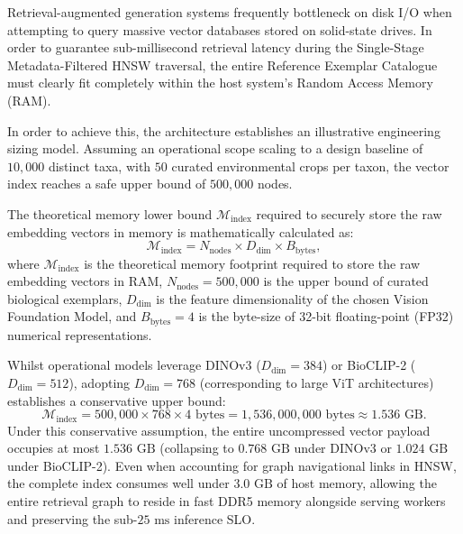 Retrieval-augmented generation systems frequently bottleneck on disk I/O when attempting to query massive vector databases stored on solid-state drives. In order to guarantee sub-millisecond retrieval latency during the Single-Stage Metadata-Filtered HNSW traversal, the entire Reference Exemplar Catalogue must clearly fit completely within the host system's Random Access Memory (RAM).

In order to achieve this, the architecture establishes an illustrative engineering sizing model. Assuming an operational scope scaling to a design baseline of $10{,}000$ distinct taxa, with $50$ curated environmental crops per taxon, the vector index reaches a safe upper bound of $500{,}000$ nodes.

The theoretical memory lower bound $\mathcal{M}_{\text{index}}$ required to securely store the raw embedding vectors in memory is mathematically calculated as:
\[
\mathcal{M}_{\text{index}} = N_{\text{nodes}} \times D_{\text{dim}} \times B_{\text{bytes}},
\]
where $\mathcal{M}_{\text{index}}$ is the theoretical memory footprint required to store the raw embedding vectors in RAM, $N_{\text{nodes}} = 500{,}000$ is the upper bound of curated biological exemplars, $D_{\text{dim}}$ is the feature dimensionality of the chosen Vision Foundation Model, and $B_{\text{bytes}} = 4$ is the byte-size of 32-bit floating-point (FP32) numerical representations.

Whilst operational models leverage DINOv3 ($D_{\text{dim}} = 384$) or BioCLIP-2 ($D_{\text{dim}} = 512$), adopting $D_{\text{dim}} = 768$ (corresponding to large ViT architectures) establishes a conservative upper bound:
\[
\mathcal{M}_{\text{index}} = 500{,}000 \times 768 \times 4 \text{ bytes} = 1{,}536{,}000{,}000 \text{ bytes} \approx 1.536 \text{ GB}.
\]
Under this conservative assumption, the entire uncompressed vector payload occupies at most $1.536\text{ GB}$ (collapsing to $0.768\text{ GB}$ under DINOv3 or $1.024\text{ GB}$ under BioCLIP-2). Even when accounting for graph navigational links in HNSW, the complete index consumes well under $3.0\text{ GB}$ of host memory, allowing the entire retrieval graph to reside in fast DDR5 memory alongside serving workers and preserving the sub-$25\text{ ms}$ inference SLO.

